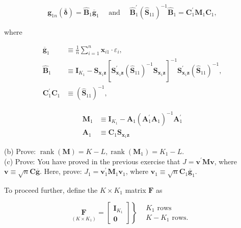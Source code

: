 \documentclass[10pt]{article}
\begin{document}
$$
\mathbf{g}_{1 n}(\overline{\boldsymbol{\delta}})=\widehat{\mathbf{B}}_{1} \overline{\mathbf{g}}_{1} \quad \text { and } \quad \widehat{\mathbf{B}}_{1}^{\prime}\left(\widehat{\mathbf{S}}_{11}\right)^{-1} \widehat{\mathbf{B}}_{1}=\mathbf{C}_{1}^{\prime} \mathbf{M}_{1} \mathbf{C}_{1},
$$

where

$$
\begin{aligned}
\overline{\mathbf{g}}_{1} & \equiv \frac{1}{n} \sum_{i=1}^{n} \mathbf{x}_{i 1} \cdot \varepsilon_{i}, \\
\widehat{\mathbf{B}}_{1} & \equiv \mathbf{I}_{K_{1}}-\mathbf{S}_{\mathbf{x}_{1} \mathbf{z}}\left[\mathbf{S}_{\mathbf{x}_{1} \mathbf{z}}^{\prime}\left(\widehat{\mathbf{S}}_{11}\right)^{-1} \mathbf{S}_{\mathbf{x}_{1} \mathbf{z}}\right]^{-1} \mathbf{S}_{\mathbf{x}_{1} \mathbf{z}}^{\prime}\left(\widehat{\mathbf{S}}_{11}\right)^{-1}, \\
\mathbf{C}_{1}^{\prime} \mathbf{C}_{1} & \equiv\left(\widehat{\mathbf{S}}_{11}\right)^{-1},
\end{aligned}
$$

$$
\begin{aligned}
\mathbf{M}_{1} & \equiv \mathbf{I}_{K_{1}}-\mathbf{A}_{1}\left(\mathbf{A}_{1}^{\prime} \mathbf{A}_{1}\right)^{-1} \mathbf{A}_{1}^{\prime} \\
\mathbf{A}_{1} & \equiv \mathbf{C}_{1} \mathbf{S}_{\mathbf{x}_{1} \mathbf{z}}
\end{aligned}
$$

(b) Prove: $\operatorname{rank}(\mathbf{M})=K-L, \operatorname{rank}\left(\mathbf{M}_{1}\right)=K_{1}-L$.\\
(c) Prove: You have proved in the previous exercise that $J=\mathbf{v}^{\prime} \mathbf{M v}$, where $\mathbf{v} \equiv \sqrt{n} \mathbf{C} \overline{\mathbf{g}}$. Here, prove: $J_{1}=\mathbf{v}_{1}^{\prime} \mathbf{M}_{1} \mathbf{v}_{1}$, where $\mathbf{v}_{1} \equiv \sqrt{n} \mathbf{C}_{1} \overline{\mathbf{g}}_{1}$.

To proceed further, define the $K \times K_{1}$ matrix $\mathbf{F}$ as

$$
\left.\underset{\left(K \times K_{1}\right)}{\mathbf{F}}=\left[\begin{array}{c}
\mathbf{I}_{K_{1}} \\
\mathbf{0}
\end{array}\right]\right\} \begin{aligned}
& K_{1} \text { rows } \\
& K-K_{1} \text { rows. }
\end{aligned}
$$
\end{document}
